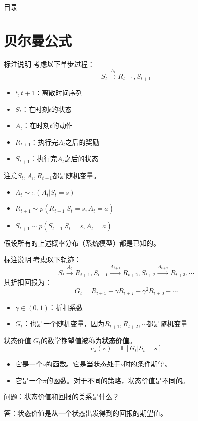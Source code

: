 \begin{frame}{目录}
    \tableofcontents
\end{frame}

\section{贝尔曼公式}

\begin{frame}{标注说明}
    考虑以下单步过程：
    \[
        S_t\xrightarrow{A_t}R_{t+1},S_{t+1}
    \]
    \begin{itemize}
        \item $t,t+1$：离散时间序列
        \item $S_t$：在时刻$t$的状态
        \item $A_t$：在时刻$t$的动作
        \item $R_{t+1}$：执行完$A_t$之后的奖励
        \item $S_{t+1}$：执行完$A_t$之后的状态
    \end{itemize}
    注意$S_t,A_t,R_{t+1}$都是随机变量。

    \begin{itemize}
        \item $A_t\sim \pi(A_t|S_t=s)$
        \item $R_{t+1}\sim p(R_{t+1}|S_t=s,A_t=a)$
        \item $S_{t+1}\sim p(S_{t+1}|S_t=s,A_t=a)$
    \end{itemize}
    假设所有的上述概率分布（系统模型）都是已知的。
\end{frame}

\begin{frame}{标注说明}
    考虑以下轨迹：
    \[
        S_t\xrightarrow{A_t}R_{t+1},S_{t+1}\xrightarrow{A_{t+1}}R_{t+2},S_{t+2}\xrightarrow{A_{t+2}}R_{t+3},\cdots
    \]
    其折扣回报为：
    \[
        G_t=R_{t+1}+\gamma R_{t+2}+\gamma^2 R_{t+3}+\cdots
    \]
    \begin{itemize}
        \item $\gamma\in(0,1)$：折扣系数
        \item $G_t$：也是一个随机变量，因为$R_{t+1},R_{t+2},\cdots$都是随机变量
    \end{itemize}
\end{frame}

\begin{frame}{状态价值}
    $G_t$的数学期望值被称为\textbf{状态价值}。
    \[
        v_{\pi}(s)=\mathbb{E}[G_t|S_t=s]
    \]
    \begin{itemize}
        \item 它是一个$s$的函数。它是当状态处于$s$时的条件期望。
        \item 它是一个$\pi$的函数。对于不同的策略，状态价值是不同的。
    \end{itemize}
    问题：状态价值和回报的关系是什么？

    答：状态价值是从一个状态出发得到的回报的期望值。
\end{frame}

